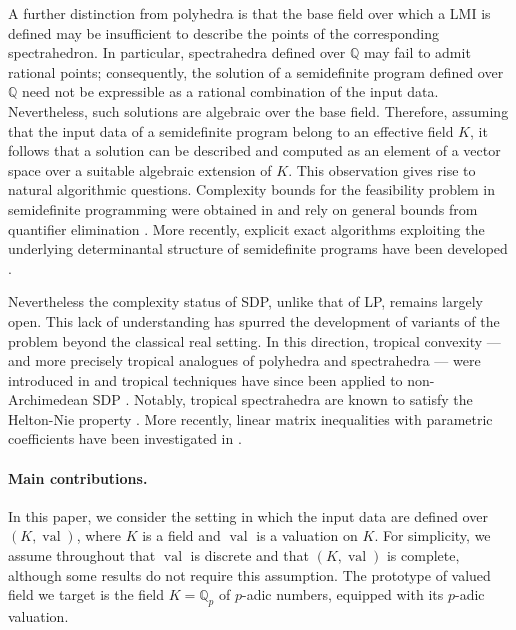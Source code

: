 \documentclass[sigconf]{acmart}
\DeclareMathOperator{\val}{val}
\def\QQ{\ensuremath{\mathbb{Q}}}
\begin{document}
A further distinction from polyhedra is that the base field over which a LMI is defined may be insufficient to describe the points of the corresponding spectrahedron. In particular, spectrahedra defined over $\QQ$ may fail to admit rational points; consequently, the solution of a semidefinite program defined over $\QQ$ need not be expressible as a rational combination of the input data. Nevertheless, such solutions are algebraic over the base field. Therefore, assuming that the input data of a semidefinite program belong to an effective field $K$, it follows that a solution can be described and computed as an element of a vector space over a suitable algebraic extension of $K$. This observation gives rise to natural algorithmic questions. Complexity bounds for the feasibility problem in semidefinite programming were obtained in \cite{porkolab1997complexity} and rely on general bounds from quantifier elimination \cite{renegar1992computational}. More recently, explicit exact algorithms exploiting the underlying determinantal structure of semidefinite programs have been developed \cite{henrion2016exact,NALDI2018206}.

Nevertheless the complexity status of SDP, unlike that of LP, remains largely
open. This lack of understanding has spurred the development of variants of the problem beyond the classical 
real setting.
In this direction, tropical convexity --- and more precisely tropical analogues of polyhedra and spectrahedra ---
were introduced in \cite{develin2004tropical,allamigeon_tropical_2020} and tropical techniques have since been applied to
non-Archimedean SDP \cite{allamigeon2016solving}. Notably, tropical spectrahedra are known to satisfy
the Helton-Nie property \cite{allamigeon2019tropical}. More recently, linear matrix inequalities with parametric coefficients
have been investigated in \cite{naldi2025solving}.

\paragraph{Main contributions.}
In this paper, we consider the setting in which the input data are defined over $(K,\val)$, where $K$ is a field and
$\val$ is a valuation on $K$. For simplicity, we assume throughout that $\val$ is discrete and that $(K,\val)$ is complete, although some results do not require this assumption. The prototype of valued field we target is the field $K=\QQ_p$ of $p$-adic numbers, equipped with its $p$-adic valuation.

\end{document}
